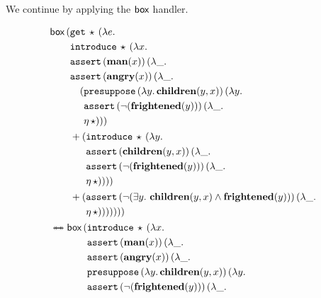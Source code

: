 We continue by applying the $\textsf{box}$ handler.

\begin{align*}
   &\ap{\BOX}{(\begin{aligned}[t]
      &\app{\op{get}}{\star}{(\lam{e}{ \\
      &\app{\op{introduce}}{\star}{(\lam{x}{ \\
      &\app{\op{assert}}{(\obj{man}(x))}{(\lam{\_}{ \\
      &\app{\op{assert}}{(\obj{angry}(x))}{(\lam{\_}{ \\
      &\quad \begin{aligned}[t]
          (&\app{\op{presuppose}}{(\lam{y}{\obj{children}(y, x)})}{(\lam{y}{ \\
           &\app{\op{assert}}{(\lnot (\obj{frightened}(y)))}{(\lam{\_}{ \\
           &\etaE{\star}})}})})
         \end{aligned} \\
      &+ \begin{aligned}[t]
          (&\app{\op{introduce}}{\star}{(\lam{y}{ \\
           &\app{\op{assert}}{(\obj{children}(y, x))}{(\lam{\_}{ \\
           &\app{\op{assert}}{(\lnot (\obj{frightened}(y)))}{(\lam{\_}{ \\
           &\etaE{\star}})}})}})})
         \end{aligned} \\
      &+ \begin{aligned}[t]
          (&\app{\op{assert}}{(\lnot (\exists y.\ \obj{children}(y, x) \land \obj{frightened}(y)))}{(\lam{\_}{ \\
           &\etaE{\star}})}))))))
         \end{aligned}}}}}}}}}
    \end{aligned}} \\
   &\ttoffrom \begin{aligned}[t]
      &\begin{aligned}[t]
         \ap{\BOX}{(&\app{\op{introduce}}{\star}{(\lam{x}{ \\
                    &\app{\op{assert}}{(\obj{man}(x))}{(\lam{\_}{ \\
                    &\app{\op{assert}}{(\obj{angry}(x))}{(\lam{\_}{ \\
                    &\app{\op{presuppose}}{(\lam{y}{\obj{children}(y, x)})}{(\lam{y}{ \\
                    &\app{\op{assert}}{(\lnot (\obj{frightened}(y)))}{(\lam{\_}{ \\
}}}}}}}}}}}
\end{aligned}
\end{aligned}
\end{align*}
